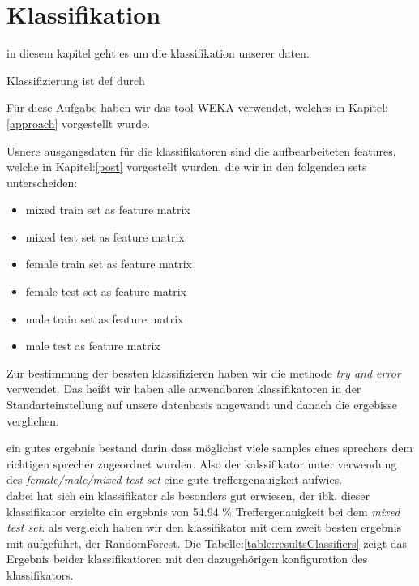 \section{Klassifikation}
\label{classification}

in diesem kapitel geht es um die klassifikation unserer daten.

Klassifizierung ist def durch


Für diese Aufgabe haben wir das tool WEKA verwendet, welches in Kapitel:\ref{approach} vorgestellt wurde.

Usnere ausgangsdaten für die klassifikatoren sind die aufbearbeiteten features, welche in Kapitel:\ref{post} vorgestellt wurden, die wir in den folgenden sets unterscheiden:
\begin{itemize}
    \item[\textbullet] mixed train set as feature matrix
    \item[\textbullet] mixed test set as feature matrix
    \item[\textbullet] female train set as feature matrix
    \item[\textbullet] female test set as feature matrix
    \item[\textbullet] male train set as feature matrix
    \item[\textbullet] male test as feature matrix
\end{itemize}



Zur bestimmung der bessten klassifizieren haben wir die methode \textit{try and error} verwendet. Das heißt wir haben alle anwendbaren klassifikatoren in der Standarteinstellung auf unsere datenbasis angewandt und danach die ergebisse verglichen.

ein gutes ergebnis bestand darin dass möglichst viele samples eines sprechers dem richtigen sprecher zugeordnet wurden. Also der kalssifikator unter verwendung des \textit{female/male/mixed test set} eine gute treffergenauigkeit aufwies.\\





dabei hat sich ein klassifikator als besonders gut erwiesen, der ibk. dieser klassifikator erzielte ein ergebnis von 54.94 \% Treffergenauigkeit bei dem 
\textit{mixed test set}.
als vergleich haben wir den klassifikator mit dem zweit besten ergebnis mit aufgeführt, der RandomForest. Die Tabelle:\ref{table:resultsClassifiers} zeigt das Ergebnis beider klassifikatioren mit den dazugehörigen konfiguration des klassifikators. \\


